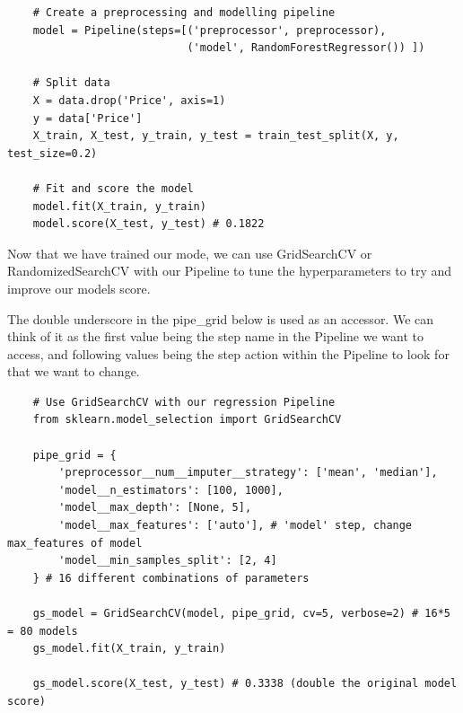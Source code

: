 \documentclass[11pt, a4paper]{article}
\begin{document}
\begin{spacing}{1.1}
\begin{lstlisting}
	# Create a preprocessing and modelling pipeline
	model = Pipeline(steps=[('preprocessor', preprocessor), 
	                        ('model', RandomForestRegressor()) ])
	
	# Split data
	X = data.drop('Price', axis=1)
	y = data['Price'] 
	X_train, X_test, y_train, y_test = train_test_split(X, y, test_size=0.2)
	
	# Fit and score the model
	model.fit(X_train, y_train)
	model.score(X_test, y_test) # 0.1822 \end{lstlisting} \vspace*{1mm}
	Now that we have trained our mode, we can use GridSearchCV or RandomizedSearchCV with our Pipeline to tune the hyperparameters to try and improve our models score. \newpage

	\noindent The double underscore in the pipe\_grid below is used as an accessor. We can think of it as the first value being the step name in the Pipeline we want to access, and following values being the step action within the Pipeline to look for that we want to change.
	\begin{lstlisting}
	# Use GridSearchCV with our regression Pipeline
	from sklearn.model_selection import GridSearchCV
	
	pipe_grid = {
		'preprocessor__num__imputer__strategy': ['mean', 'median'],
		'model__n_estimators': [100, 1000],	
		'model__max_depth': [None, 5],
		'model__max_features': ['auto'], # 'model' step, change max_features of model
		'model__min_samples_split': [2, 4]
	} # 16 different combinations of parameters
	
	gs_model = GridSearchCV(model, pipe_grid, cv=5, verbose=2) # 16*5 = 80 models
	gs_model.fit(X_train, y_train) 
	
	gs_model.score(X_test, y_test) # 0.3338 (double the original model score) \end{lstlisting} \vspace*{2mm}
	

\end{spacing}
\end{document}
